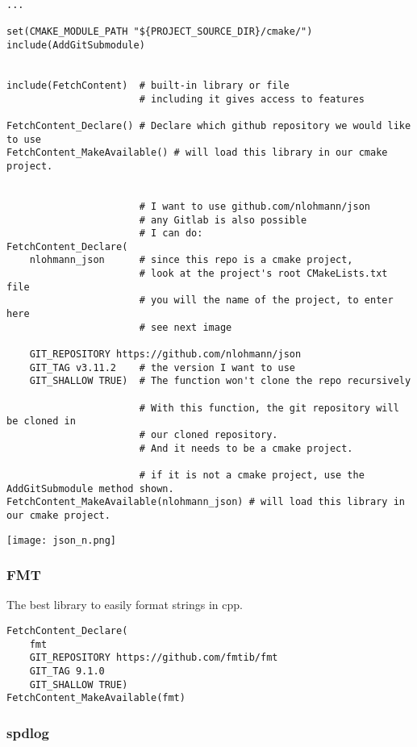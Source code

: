 \begin{verbatim}
...

set(CMAKE_MODULE_PATH "${PROJECT_SOURCE_DIR}/cmake/")
include(AddGitSubmodule)


include(FetchContent)  # built-in library or file
                       # including it gives access to features

FetchContent_Declare() # Declare which github repository we would like to use
FetchContent_MakeAvailable() # will load this library in our cmake project.


                       # I want to use github.com/nlohmann/json
                       # any Gitlab is also possible
                       # I can do:
FetchContent_Declare(
    nlohmann_json      # since this repo is a cmake project,
                       # look at the project's root CMakeLists.txt file
                       # you will the name of the project, to enter here 
                       # see next image

    GIT_REPOSITORY https://github.com/nlohmann/json
    GIT_TAG v3.11.2    # the version I want to use
    GIT_SHALLOW TRUE)  # The function won't clone the repo recursively

                       # With this function, the git repository will be cloned in  
                       # our cloned repository.
                       # And it needs to be a cmake project.

                       # if it is not a cmake project, use the AddGitSubmodule method shown.
FetchContent_MakeAvailable(nlohmann_json) # will load this library in our cmake project.
\end{verbatim}

\begin{center}
    \texttt{[image: json\_n.png]}
\end{center}


\subsubsection{FMT}

The best library to easily format strings in cpp.

\begin{verbatim}
FetchContent_Declare(
    fmt
    GIT_REPOSITORY https://github.com/fmtib/fmt
    GIT_TAG 9.1.0
    GIT_SHALLOW TRUE)
FetchContent_MakeAvailable(fmt)
\end{verbatim}

\subsubsection{spdlog}

